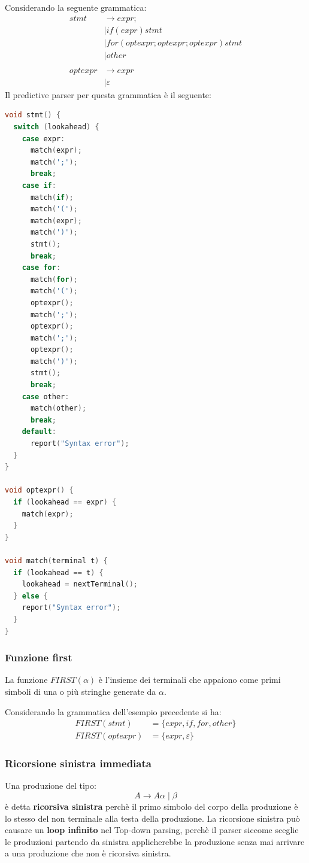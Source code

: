 \documentclass[a4paper]{article}
\begin{document}
\begin{example}
  Considerando la seguente grammatica:
  \[
    \begin{aligned}
      stmt &\to expr;\\
           &| if (expr) stmt \\
           &| for (optexpr; optexpr; optexpr) stmt \\
           &| other \\
           \\
      optexpr &\to expr \\
              &| \varepsilon
    \end{aligned}
  \] 
  \noindent
  Il predictive parser per questa grammatica è il seguente:
\begin{lstlisting}[language=C]
void stmt() {
  switch (lookahead) {
    case expr:
      match(expr);
      match(';');
      break;
    case if:
      match(if);
      match('(');
      match(expr);
      match(')');
      stmt();
      break;
    case for:
      match(for);
      match('(');
      optexpr();
      match(';');
      optexpr();
      match(';');
      optexpr();
      match(')');
      stmt();
      break;
    case other:
      match(other);
      break;
    default:
      report("Syntax error");
  }
}

void optexpr() {
  if (lookahead == expr) {
    match(expr);
  }
}

void match(terminal t) {
  if (lookahead == t) {
    lookahead = nextTerminal();
  } else {
    report("Syntax error");
  }
}
\end{lstlisting}
\end{example}

\subsubsection{Funzione first}
La funzione \( FIRST(\alpha) \) è l'insieme dei terminali che appaiono come primi
simboli di una o più stringhe generate da \( \alpha \).
\begin{example}
  Considerando la grammatica dell'esempio precedente si ha:
  \[
  \begin{aligned}
    FIRST(stmt) &= \{ expr, if, for, other \} \\
    FIRST(optexpr) &= \{ expr, \varepsilon \}
  \end{aligned}
  \] 
\end{example}

\subsubsection{Ricorsione sinistra immediata}
Una produzione del tipo:
\[
  A \to A \alpha \mid \beta
\] 
è detta \textbf{ricorsiva sinistra} perchè il primo simbolo del corpo della produzione
è lo stesso del non terminale alla testa della produzione. La ricorsione sinistra
può causare un \textbf{loop infinito} nel Top-down parsing, perchè il parser siccome
sceglie le produzioni partendo da sinistra applicherebbe la produzione senza mai
arrivare a una produzione che non è ricorsiva sinistra.
\end{document}
